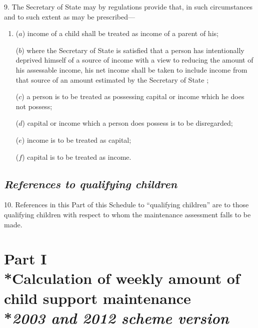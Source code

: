 \documentclass[12pt,a4paper]{article}
\begin{document}
9. The Secretary of State may by regulations provide that, in such circumstances and to such extent as may be prescribed—
\begin{enumerate}\item[]
($a$) income of a child shall be treated as income of a parent of his;

($b$) where 
the Secretary of State  %
is satisfied that a person has intentionally deprived himself of a source of income with a view to reducing the amount of his assessable income, his net income shall be taken to include income from that source of an amount estimated by 
the Secretary of State%
;

($c$) a person is to be treated as possessing capital or income which he does not possess;

($d$) capital or income which a person does possess is to be disregarded;

($e$) income is to be treated as capital;

($f$) capital is to be treated as income.
\end{enumerate}


\subsection*{\itshape References to qualifying children}

10. References in this Part of this Schedule to “qualifying children” are to those qualifying children with respect to whom the maintenance assessment falls to be made.


\section[Part I --- Calculation of weekly amount of child support maintenance --- \emph{2003 and 2012 scheme version}]{Part I\\*Calculation of weekly amount of child support maintenance\\*\emph{2003 and 2012 scheme version}}
\end{document}
